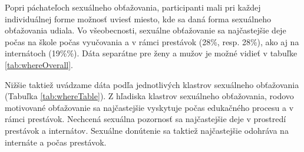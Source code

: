 \documentclass[
]{article}
\begin{document}
Popri páchateľoch sexuálneho obťažovania, participanti mali pri každej individuálnej forme možnosť uviesť miesto, kde sa daná forma sexuálneho obťažovania udiala. Vo všeobecnosti, sexuálne obťažovanie sa najčastejšie deje počas na škole počas vyučovania a v rámci prestávok (28\%, resp. 28\%), ako aj na internátoch (19\%\%). Dáta separátne pre ženy a mužov je možné vidieť v tabuľke \ref{tab:whereOverall}.

Nižšie taktiež uvádzame dáta podľa jednotlivých klastrov sexuálneho obťažovania (Tabuľka \ref{tab:whereTable}). Z hľadiska klastrov sexuálneho obťažovania, rodovo motivované obťažovanie sa najčastejšie vyskytuje počas edukačného procesu a v rámci prestávok. Nechcená sexuálna pozornosť sa najčastejšie deje v prostredí prestávok a internátov. Sexuálne donútenie sa taktiež najčastejšie odohráva na internáte a počas prestávok.

\begin{table}[H]

\caption{\label{tab:whereOverall}Miesto sexuálneho obťažovania}
\centering
{}
\end{table}
\end{document}
